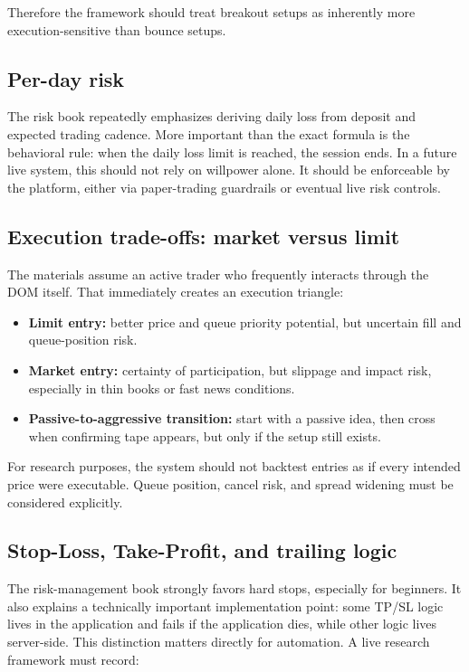 Therefore the framework should treat breakout setups as inherently more execution-sensitive than bounce setups.

\subsection{Per-day risk}

The risk book repeatedly emphasizes deriving daily loss from deposit and expected trading cadence. More important than the exact formula is the behavioral rule: when the daily loss limit is reached, the session ends. In a future live system, this should not rely on willpower alone. It should be enforceable by the platform, either via paper-trading guardrails or eventual live risk controls.

\subsection{Execution trade-offs: market versus limit}

The materials assume an active trader who frequently interacts through the DOM itself. That immediately creates an execution triangle:

\begin{itemize}[leftmargin=1.5em]
\item \textbf{Limit entry:} better price and queue priority potential, but uncertain fill and queue-position risk.
\item \textbf{Market entry:} certainty of participation, but slippage and impact risk, especially in thin books or fast news conditions.
\item \textbf{Passive-to-aggressive transition:} start with a passive idea, then cross when confirming tape appears, but only if the setup still exists.
\end{itemize}

For research purposes, the system should not backtest entries as if every intended price were executable. Queue position, cancel risk, and spread widening must be considered explicitly.

\subsection{Stop-Loss, Take-Profit, and trailing logic}

The risk-management book strongly favors hard stops, especially for beginners. It also explains a technically important implementation point: some TP/SL logic lives in the application and fails if the application dies, while other logic lives server-side. This distinction matters directly for automation. A live research framework must record:


